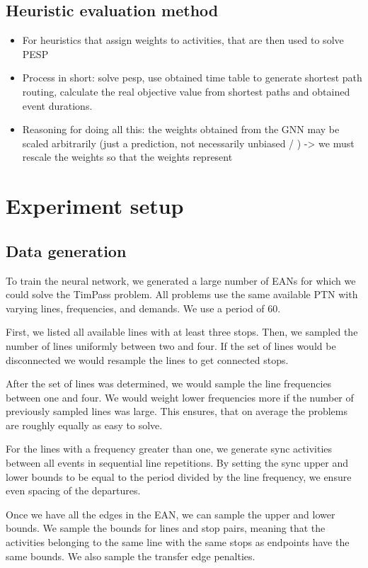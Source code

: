 \documentclass[english, 12pt, a4paper, sci, utf8, a-2b, online]{aaltothesis}
\begin{document}
\subsection{Heuristic evaluation method}
\begin{itemize}
    \item For heuristics that assign weights to activities, that are then used to solve PESP
    \item Process in short: solve pesp, use obtained time table to generate shortest path routing, calculate the real objective value from shortest paths and obtained event durations.
    \item Reasoning for doing all this: the weights obtained from the GNN may be scaled arbitrarily (just a prediction, not necessarily unbiased / ) -> we must rescale the weights so that the weights represent 
\end{itemize}

\clearpage
\section{Experiment setup}
\subsection{Data generation}

To train the neural network, we generated a large number of EANs for which we could solve the TimPass problem. All problems use the same available PTN with varying lines, frequencies, and demands. We use a period of 60.

First, we listed all available lines with at least three stops. Then, we sampled the number of lines uniformly between two and four. If the set of lines would be disconnected we would resample the lines to get connected stops.

After the set of lines was determined, we would sample the line frequencies between one and four. We would weight lower frequencies more if the number of previously sampled lines was large. This ensures, that on average the problems are roughly equally as easy to solve.

For the lines with a frequency greater than one, we generate sync activities between all events in sequential line repetitions. By setting the sync upper and lower bounds to be equal to the period divided by the line frequency, we ensure even spacing of the departures.

Once we have all the edges in the EAN, we can sample the upper and lower bounds. We sample the bounds for lines and stop pairs, meaning that the activities belonging to the same line with the same stops as endpoints have the same bounds. We also sample the transfer edge penalties.
\end{document}
